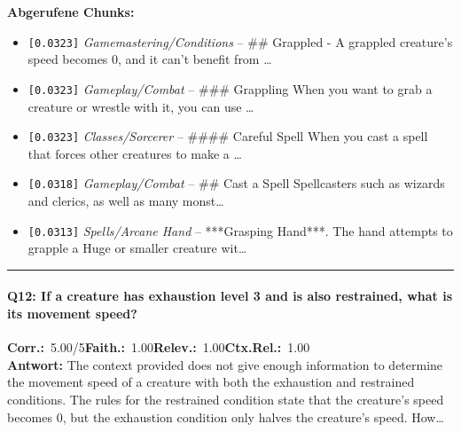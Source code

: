 \noindent\textbf{Abgerufene Chunks:}
\begin{itemize}[noitemsep, topsep=2pt]
  \item[\textbf{\#1}] \texttt{[0.0323]} \textit{Gamemastering/Conditions} -- \#\# Grappled  - A grappled creature's speed becomes 0, and it can't benefit from \ldots
  \item[\textbf{\#2}] \texttt{[0.0323]} \textit{Gameplay/Combat} -- \#\#\# Grappling  When you want to grab a creature or wrestle with it, you can use \ldots
  \item[\textbf{\#3}] \texttt{[0.0323]} \textit{Classes/Sorcerer} -- \#\#\#\# Careful Spell  When you cast a spell that forces other creatures to make a \ldots
  \item[\textbf{\#4}] \texttt{[0.0318]} \textit{Gameplay/Combat} -- \#\# Cast a Spell  Spellcasters such as wizards and clerics, as well as many monst\ldots
  \item[\textbf{\#5}] \texttt{[0.0313]} \textit{Spells/Arcane Hand} -- ***Grasping Hand***. The hand attempts to grapple a Huge or smaller creature wit\ldots
\end{itemize}
\vspace{4pt}
\hrule
\vspace{6pt}

\paragraph{Q12: If a creature has exhaustion level 3 and is also restrained, what is its movement speed?}
\noindent \textbf{Corr.:}~5.00/5\quad \textbf{Faith.:}~1.00\quad \textbf{Relev.:}~1.00\quad \textbf{Ctx.Rel.:}~1.00\\

\noindent\textbf{Antwort:} The context provided does not give enough information to determine the movement speed of a creature with both the exhaustion and restrained conditions. The rules for the restrained condition state that the creature's speed becomes 0, but the exhaustion condition only halves the creature's speed. How\ldots

